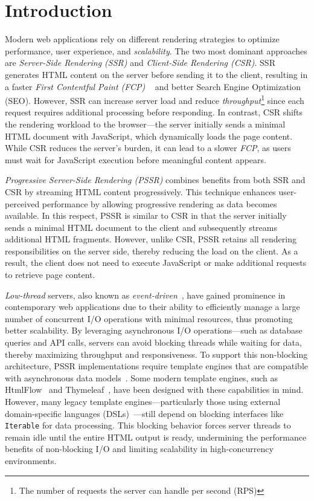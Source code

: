 \section{Introduction}


Modern web applications rely on different rendering strategies to optimize
performance, user experience, and \textit{scalability}. The two most dominant
approaches are \textit{Server-Side Rendering (SSR)} and \textit{Client-Side
    Rendering (CSR)}. SSR generates HTML content on the server before sending it to
the client, resulting in a faster \textit{First Contentful Paint (FCP)}
~\cite{Edgar2024-FCP} and better Search Engine Optimization (SEO). However, SSR
can increase server load and reduce \textit{throughput}\footnote{The number of
    requests the server can handle per second (RPS)} since each request requires
additional processing before responding. In contrast, CSR shifts the rendering
workload to the browser—the server initially sends a minimal HTML document with
JavaScript, which dynamically loads the page content. While CSR reduces the
server’s burden, it can lead to a slower \textit{FCP}, as users must wait for
JavaScript execution before meaningful content appears.

\textit{Progressive Server-Side Rendering (PSSR)} combines benefits from both SSR and CSR
by streaming HTML content progressively. This technique enhances user-perceived performance by
allowing progressive rendering as data becomes available. In this respect,
PSSR is similar to CSR in that the server initially sends a minimal HTML
document to the client and subsequently streams additional HTML fragments.
However, unlike CSR, PSSR retains all rendering responsibilities on the server side,
thereby reducing the load on the client. As a result, the client does
not need to execute JavaScript or make additional requests to retrieve page content.

\textit{Low-thread} servers, also known as
\textit{event-driven}~\cite{event-driven-servers}, have gained prominence in
contemporary web applications due to their ability to efficiently manage a large
number of concurrent I/O operations with minimal resources, thus promoting
better scalability.
By leveraging asynchronous I/O operations—such as
database queries and API calls, servers can avoid blocking threads while
waiting for data, thereby maximizing throughput and responsiveness. To support
this non-blocking architecture, PSSR implementations require template engines
that are compatible with asynchronous data models~\cite{carvalho2023async}.
Some modern template
engines, such as HtmlFlow~\cite{htmlflow} and Thymeleaf~\cite{thymeleaf}, have
been designed with these capabilities in mind. However, many legacy
template engines—particularly those using external domain-specific languages
(DSLs)~\cite{Fowler03}—still depend on blocking interfaces like
\texttt{Iterable} for data processing. This blocking behavior forces server
threads to remain idle until the entire HTML output is ready, undermining the
performance benefits of non-blocking I/O and limiting scalability in
high-concurrency environments. 

